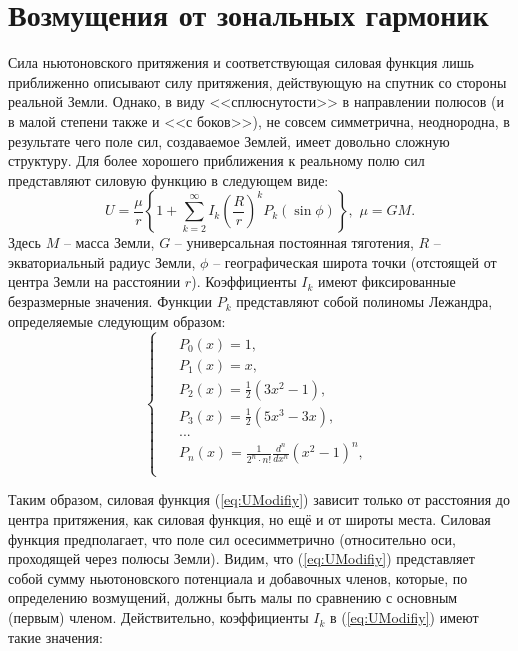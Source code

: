 \section{Возмущения от зональных гармоник}
\noindent\indent Сила ньютоновского притяжения и соответствующая силовая функция
лишь приближенно описывают силу притяжения, действующую на спутник со стороны
реальной Земли. Однако, в виду <<сплюснутости>> в направлении полюсов (и в малой
степени также и <<с боков>>), не совсем симметрична, неоднородна, в результате
чего поле сил, создаваемое Землей, имеет довольно сложную структуру. Для более
хорошего приближения к реальному полю сил представляют силовую функцию в следующем виде:
\begin{equation} \label{eq:UModifiy}
  U = \frac{\mu}{r}\left\{1 + \sum\limits_{k=2}^{\infty}I_k\left(\frac{R}{r}\right)^kP_k(\sin\phi)\right\},\,\,
  \mu = GM.
\end{equation}
Здесь $M$ -- масса Земли, $G$ -- универсальная постоянная тяготения, $R$ -- экваториальный
радиус Земли, $\phi$ -- географическая широта точки (отстоящей от центра Земли на
расстоянии $r$). Коэффициенты $I_k$ имеют фиксированные безразмерные значения.
Функции $P_k$ представляют собой полиномы Лежандра, определяемые следующим образом:
\begin{equation}
  \begin{cases}
    \begin{aligned}
      & P_0(x) = 1, \\
      & P_1(x) = x, \\
      & P_2(x) = \frac{1}{2}(3x^2 - 1), \\
      & P_3(x) = \frac{1}{2}(5x^3 - 3x), \\
      & ...\\
      & P_n(x) = \frac{1}{2^n \cdot n!}\frac{d^n}{dx^n}(x^2 - 1)^n, \\
    \end{aligned}
  \end{cases}
\end{equation}\par
Таким образом, силовая функция (\ref{eq:UModifiy}) зависит только от расстояния
до центра притяжения, как силовая функция, но ещё и от широты места. Силовая
функция предполагает, что поле сил осесимметрично (относительно оси, проходящей
через полюсы Земли). Видим, что (\ref{eq:UModifiy}) представляет собой сумму
ньютоновского потенциала и добавочных членов, которые, по определению возмущений,
должны быть малы по сравнению с основным (первым) членом. Действительно,
коэффициенты $I_k$ в (\ref{eq:UModifiy}) имеют такие значения:
